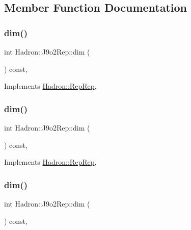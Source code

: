 \subsection{Member Function Documentation}
\mbox{\label{structHadron_1_1J9o2Rep_a66921d681b6217d1ef68bc63ad21cd15}} 
\subsubsection{\texorpdfstring{dim()}{dim()}\hspace{0.1cm}{\footnotesize\ttfamily [1/5]}}
{\footnotesize\ttfamily int Hadron\+::\+J9o2\+Rep\+::dim (\begin{DoxyParamCaption}{ }\end{DoxyParamCaption}) const\hspace{0.3cm}{\ttfamily [inline]}, {\ttfamily [virtual]}}



Implements \mbox{\hyperlink{structHadron_1_1RepRep_a92c8802e5ed7afd7da43ccfd5b7cd92b}{Hadron\+::\+Rep\+Rep}}.

\mbox{\label{structHadron_1_1J9o2Rep_a66921d681b6217d1ef68bc63ad21cd15}} 
\subsubsection{\texorpdfstring{dim()}{dim()}\hspace{0.1cm}{\footnotesize\ttfamily [2/5]}}
{\footnotesize\ttfamily int Hadron\+::\+J9o2\+Rep\+::dim (\begin{DoxyParamCaption}{ }\end{DoxyParamCaption}) const\hspace{0.3cm}{\ttfamily [inline]}, {\ttfamily [virtual]}}



Implements \mbox{\hyperlink{structHadron_1_1RepRep_a92c8802e5ed7afd7da43ccfd5b7cd92b}{Hadron\+::\+Rep\+Rep}}.

\mbox{\label{structHadron_1_1J9o2Rep_a66921d681b6217d1ef68bc63ad21cd15}} 
\subsubsection{\texorpdfstring{dim()}{dim()}\hspace{0.1cm}{\footnotesize\ttfamily [3/5]}}
{\footnotesize\ttfamily int Hadron\+::\+J9o2\+Rep\+::dim (\begin{DoxyParamCaption}{ }\end{DoxyParamCaption}) const\hspace{0.3cm}{\ttfamily [inline]}, {\ttfamily [virtual]}}



